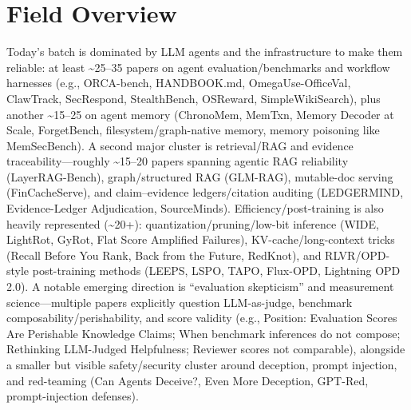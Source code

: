 \documentclass[12pt,letterpaper]{article}
\begin{document}
\section*{Field Overview}
{\footnotesize Today's batch is dominated by LLM agents and the infrastructure to make them reliable: at least \textasciitilde{}25--35 papers on agent evaluation/benchmarks and workflow harnesses (e.g., ORCA-bench, HANDBOOK.md, OmegaUse-OfficeVal, ClawTrack, SecRespond, StealthBench, OSReward, SimpleWikiSearch), plus another \textasciitilde{}15--25 on agent memory (ChronoMem, MemTxn, Memory Decoder at Scale, ForgetBench, filesystem/graph-native memory, memory poisoning like MemSecBench). A second major cluster is retrieval/RAG and evidence traceability---roughly \textasciitilde{}15--20 papers spanning agentic RAG reliability (LayerRAG-Bench), graph/structured RAG (GLM-RAG), mutable-doc serving (FinCacheServe), and claim--evidence ledgers/citation auditing (LEDGERMIND, Evidence-Ledger Adjudication, SourceMinds). Efficiency/post-training is also heavily represented (\textasciitilde{}20+): quantization/pruning/low-bit inference (WIDE, LightRot, GyRot, Flat Score Amplified Failures), KV-cache/long-context tricks (Recall Before You Rank, Back from the Future, RedKnot), and RLVR/OPD-style post-training methods (LEEPS, LSPO, TAPO, Flux-OPD, Lightning OPD 2.0). A notable emerging direction is ``evaluation skepticism'' and measurement science---multiple papers explicitly question LLM-as-judge, benchmark composability/perishability, and score validity (e.g., Position: Evaluation Scores Are Perishable Knowledge Claims; When benchmark inferences do not compose; Rethinking LLM-Judged Helpfulness; Reviewer scores not comparable), alongside a smaller but visible safety/security cluster around deception, prompt injection, and red-teaming (Can Agents Deceive?, Even More Deception, GPT-Red, prompt-injection defenses).}
\end{document}
